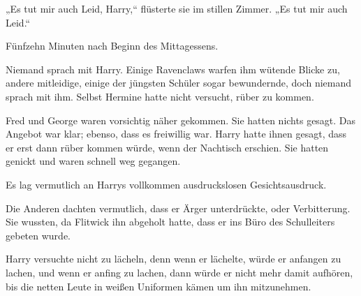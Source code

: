 „Es tut mir auch Leid, Harry,“ flüsterte sie im stillen Zimmer. „Es tut mir auch Leid.“

\later

Fünfzehn Minuten nach Beginn des Mittagessens.

Niemand sprach mit Harry. Einige Ravenclaws warfen ihm wütende Blicke zu, andere mitleidige, einige der jüngsten Schüler sogar bewundernde, doch niemand sprach mit ihm. Selbst Hermine hatte nicht versucht, rüber zu kommen.

Fred und George waren vorsichtig näher gekommen. Sie hatten nichts gesagt. Das Angebot war klar; ebenso, dass es freiwillig war. Harry hatte ihnen gesagt, dass er erst dann rüber kommen würde, wenn der Nachtisch erschien. Sie hatten genickt und waren schnell weg gegangen.

Es lag vermutlich an Harrys vollkommen ausdruckslosen Gesichtsausdruck.

Die Anderen dachten vermutlich, dass er Ärger unterdrückte, oder Verbitterung. Sie wussten, da Flitwick ihn abgeholt hatte, dass er ins Büro des Schulleiters gebeten wurde.

Harry versuchte nicht zu lächeln, denn wenn er lächelte, würde er anfangen zu lachen, und wenn er anfing zu lachen, dann würde er nicht mehr damit aufhören, bis die netten Leute in weißen Uniformen kämen um ihn mitzunehmen.

